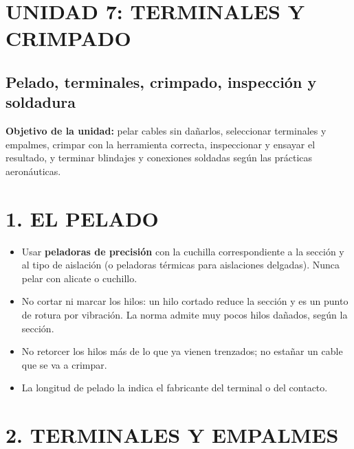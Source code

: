 \clearpage
\section*{UNIDAD 7: TERMINALES Y CRIMPADO}
\subsection*{Pelado, terminales, crimpado, inspección y soldadura}

\begin{recuadro}
\textbf{Objetivo de la unidad:} pelar cables sin dañarlos, seleccionar terminales y empalmes,
crimpar con la herramienta correcta, inspeccionar y ensayar el resultado, y terminar blindajes y
conexiones soldadas según las prácticas aeronáuticas.
\end{recuadro}

\section*{1. EL PELADO}

\begin{itemize}
  \item Usar \textbf{peladoras de precisión} con la cuchilla correspondiente a la sección y al tipo
        de aislación (o peladoras térmicas para aislaciones delgadas). Nunca pelar con alicate o
        cuchillo.
  \item No cortar ni marcar los hilos: un hilo cortado reduce la sección y es un punto de rotura
        por vibración. La norma admite muy pocos hilos dañados, según la sección.
  \item No retorcer los hilos más de lo que ya vienen trenzados; no estañar un cable que se va a
        crimpar.
  \item La longitud de pelado la indica el fabricante del terminal o del contacto.
\end{itemize}

\section*{2. TERMINALES Y EMPALMES}

